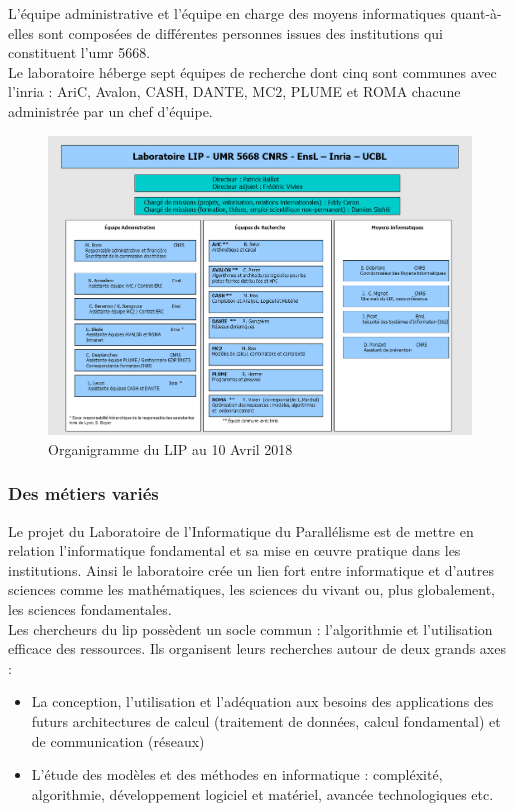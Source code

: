 L'équipe administrative et l'équipe en charge des moyens informatiques quant-à-elles sont composées de différentes personnes issues des institutions qui constituent l'\gls{umr} 5668.\\

Le laboratoire héberge sept équipes de recherche dont cinq sont communes avec l'\gls{inria} : AriC, Avalon, CASH, DANTE, MC2, PLUME et ROMA chacune administrée par un chef d'équipe.

\begin{figure}[h]
	\center
	\includegraphics[scale=0.58]{partie1/images/organigramme.png}
	\caption{Organigramme du LIP au 10 Avril 2018 \cite{organigramme}}
\end{figure}
\subsubsection{Des métiers variés}
Le projet du Laboratoire de l'Informatique du Parallélisme est de mettre en relation l'informatique fondamental et sa mise en œuvre pratique dans les institutions. Ainsi le laboratoire crée un lien fort entre informatique et d'autres sciences comme les mathématiques, les sciences du vivant ou, plus globalement, les sciences fondamentales.\cite{presUCBL}\\

Les chercheurs du \gls{lip} possèdent un socle commun : l'algorithmie et l'utilisation efficace des ressources. Ils organisent leurs recherches autour de deux grands axes :
\begin{itemize}
	\item La conception, l'utilisation et l'adéquation aux besoins des applications des futurs architectures de calcul (traitement de données, calcul fondamental) et de communication (réseaux)
	\item L'étude des modèles et des méthodes en informatique : compléxité, algorithmie, développement logiciel et matériel, avancée technologiques etc.\\
\end{itemize}

